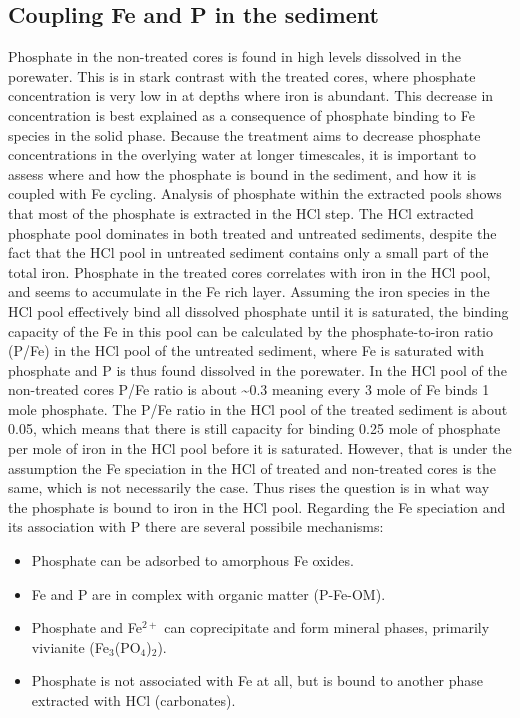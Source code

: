 \documentclass[a4paper,11pt]{article}
\begin{document}
\hypertarget{coupling-fe-and-p-in-the-sediment}{%
\subsection{Coupling Fe and P in the sediment}\label{coupling-fe-and-p-in-the-sediment}}

Phosphate in the non-treated cores is found in high levels dissolved in the porewater. This is in stark contrast with the treated cores, where phosphate concentration is very low in at depths where iron is abundant. This decrease in concentration is best explained as a consequence of phosphate binding to Fe species in the solid phase. Because the treatment aims to decrease phosphate concentrations in the overlying water at longer timescales, it is important to assess where and how the phosphate is bound in the sediment, and how it is coupled with Fe cycling. Analysis of phosphate within the extracted pools shows that most of the phosphate is extracted in the HCl step. The HCl extracted phosphate pool dominates in both treated and untreated sediments, despite the fact that the HCl pool in untreated sediment contains only a small part of the total iron. Phosphate in the treated cores correlates with iron in the HCl pool, and seems to accumulate in the Fe rich layer. Assuming the iron species in the HCl pool effectively bind all dissolved phosphate until it is saturated, the binding capacity of the Fe in this pool can be calculated by the phosphate-to-iron ratio (P/Fe) in the HCl pool of the untreated sediment, where Fe is saturated with phosphate and P is thus found dissolved in the porewater. In the HCl pool of the non-treated cores P/Fe ratio is about \textasciitilde0.3 meaning every 3 mole of Fe binds 1 mole phosphate. The P/Fe ratio in the HCl pool of the treated sediment is about 0.05, which means that there is still capacity for binding 0.25 mole of phosphate per mole of iron in the HCl pool before it is saturated. However, that is under the assumption the Fe speciation in the HCl of treated and non-treated cores is the same, which is not necessarily the case. Thus rises the question is in what way the phosphate is bound to iron in the HCl pool. Regarding the Fe speciation and its association with P there are several possibile mechanisms:
\begin{itemize}
\item
  Phosphate can be adsorbed to amorphous Fe oxides.
\item
  Fe and P are in complex with organic matter (P-Fe-OM).
\item
  Phosphate and Fe\(^{2+}\) can coprecipitate and form mineral phases, primarily vivianite (Fe\(_3\)(PO\(_4\))\(_2\)).
\item
  Phosphate is not associated with Fe at all, but is bound to another phase extracted with HCl (carbonates).
\end{itemize}
\end{document}
